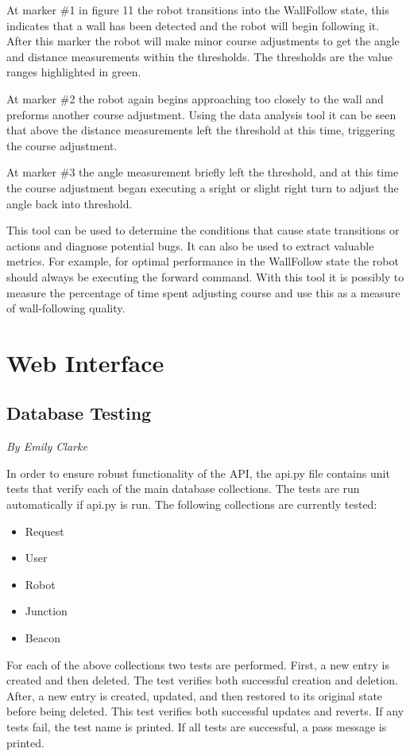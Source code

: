\documentclass[12pt]{report}
\newcommand{\sectionAuthor}[1]{{\small\vspace{-1em}\textit{#1}}\bigskip\par}
\begin{document}
At marker \#1 in figure 11 the robot transitions into the WallFollow state, this indicates that a wall has been detected and the robot will begin following it. After this marker the robot will make minor course adjustments to get the angle and distance measurements within the thresholds. The thresholds are the value ranges highlighted in green.

At marker \#2 the robot again begins approaching too closely to the wall and preforms another course adjustment. Using the data analysis tool it can be seen that above the distance measurements left the threshold at this time, triggering the course adjustment.

At marker \#3 the angle measurement briefly left the threshold, and at this time the course adjustment began executing a sright or slight right turn to adjust the angle back into threshold.

This tool can be used to determine the conditions that cause state transitions or actions and diagnose potential bugs. It can also be used to extract valuable metrics. For example, for optimal performance in the WallFollow state the robot should always be executing the forward command. With this tool it is possibly to measure the percentage of time spent adjusting course and use this as a measure of wall-following quality.

\section{Web Interface}
\subsection{Database Testing}
\sectionAuthor{By Emily Clarke}
In order to ensure robust functionality of the API, the api.py file contains unit tests that verify each of the main database collections. The tests are run automatically if api.py is run. The following collections are currently tested:
\begin{itemize}
\itemsep0em 
\item Request
\item User
\item Robot
\item Junction
\item Beacon
\end{itemize}
For each of the above collections two tests are performed. First, a new entry is created and then deleted. The test verifies both successful creation and deletion. After, a new entry is created, updated, and then restored to its original state before being deleted. This test verifies both successful updates and reverts. If any tests fail, the test name is printed. If all tests are successful, a pass message is printed.
\end{document}
